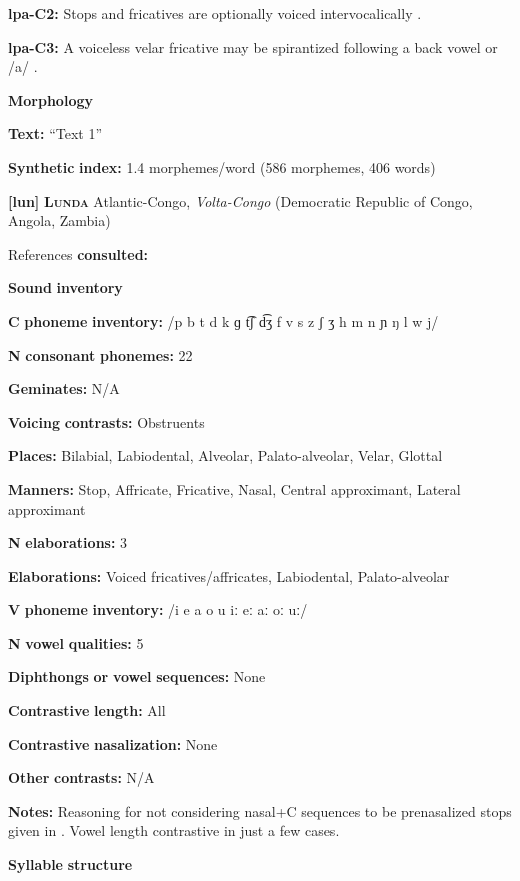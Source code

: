 \begin{styleBody}
\textbf{lpa-C2:} Stops and fricatives are optionally voiced intervocalically \citep[17]{Lacrampe2014}.

\textbf{lpa-C3:} A voiceless velar fricative may be spirantized following a back vowel or /a/ \citep[20]{Lacrampe2014}.

\textbf{Morphology}

\textbf{Text:} “Text 1” \citep[495-500]{Lacrampe2014}

\textbf{Synthetic} \textbf{index:} 1.4 morphemes/word (586 morphemes, 406 words)

\textbf{[lun]}   \textbf{\textsc{Lunda}  }  Atlantic-Congo, \textit{Volta-Congo} (Democratic Republic of Congo, Angola, Zambia)

References \textbf{consulted:} \citet{Kawasha2003}

\textbf{Sound} \textbf{inventory}

\textbf{C} \textbf{phoneme} \textbf{inventory:} /p b t d k ɡ t͡ʃ d͡ʒ f v s z ʃ ʒ h m n ɲ ŋ l w j/

\textbf{N} \textbf{consonant} \textbf{phonemes:} 22

\textbf{Geminates:} N/A

\textbf{Voicing} \textbf{contrasts:} Obstruents

\textbf{Places:} Bilabial, Labiodental, Alveolar, Palato-alveolar, Velar, Glottal

\textbf{Manners:} Stop, Affricate, Fricative, Nasal, Central approximant, Lateral approximant

\textbf{N} \textbf{elaborations:} 3

\textbf{Elaborations:} Voiced fricatives/affricates, Labiodental, Palato-alveolar

\textbf{V} \textbf{phoneme} \textbf{inventory:} /i e a o u iː eː aː oː uː/

\textbf{N} \textbf{vowel} \textbf{qualities:} 5

\textbf{Diphthongs} \textbf{or} \textbf{vowel} \textbf{sequences:} None

\textbf{Contrastive} \textbf{length:} All

\textbf{Contrastive} \textbf{nasalization:} None

\textbf{Other} \textbf{contrasts:} N/A

\textbf{Notes:} Reasoning for not considering nasal+C sequences to be prenasalized stops given in \citet[24]{Kawasha2003}. Vowel length contrastive in just a few cases.

\textbf{Syllable} \textbf{structure}


\end{styleBody}
